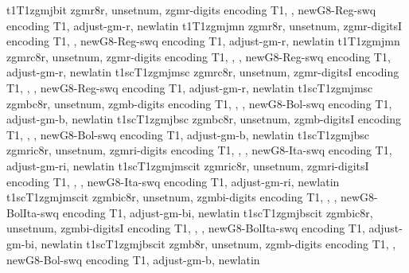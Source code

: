 {t1}{T1}{zgmj}{b}{it}{}
%
{zgmr8r,%
unsetnum,%
zgmr-digits encoding T1,%
\metrics {},%
newG8-Reg-swq encoding T1,%
adjust-gm-r,%
newlatin}
{t1}{T1}{zgmj}{m}{n}{}
%
{zgmr8r,%
unsetnum,%
zgmr-digitsI encoding T1,%
\metrics {},%
newG8-Reg-swq encoding T1,%
adjust-gm-r,%
newlatin}
{t1}{T1}{zgmj}{m}{n}{}
%
{zgmrc8r,%
unsetnum,%
zgmr-digits encoding T1,%
\metrics {}  ,%
\metrics {},%
newG8-Reg-swq encoding T1,%
adjust-gm-r,%
newlatin}
{t1sc}{T1}{zgmj}{m}{sc}{}
%
{zgmrc8r,%
unsetnum,%
zgmr-digitsI encoding T1,%
\metrics {}  ,%
\metrics {},%
newG8-Reg-swq encoding T1,%
adjust-gm-r,%
newlatin}
{t1sc}{T1}{zgmj}{m}{sc}{}
%
{zgmbc8r,%
unsetnum,%
zgmb-digits encoding T1,%
\metrics {}  ,%
\metrics {},%
newG8-Bol-swq encoding T1,%
adjust-gm-b,%
newlatin}
{t1sc}{T1}{zgmj}{b}{sc}{}
%
{zgmbc8r,%
unsetnum,%
zgmb-digitsI encoding T1,%
\metrics {}  ,%
\metrics {},%
newG8-Bol-swq encoding T1,%
adjust-gm-b,%
newlatin}
{t1sc}{T1}{zgmj}{b}{sc}{}
%
{zgmric8r,%
unsetnum,%
zgmri-digits encoding T1,%
\metrics {}  ,%
\metrics {},%
newG8-Ita-swq encoding T1,%
adjust-gm-ri,%
newlatin}
{t1sc}{T1}{zgmj}{m}{scit}{}
%
{zgmric8r,%
unsetnum,%
zgmri-digitsI encoding T1,%
\metrics {}  ,%
\metrics {},%
newG8-Ita-swq encoding T1,%
adjust-gm-ri,%
newlatin}
{t1sc}{T1}{zgmj}{m}{scit}{}
%
{zgmbic8r,%
unsetnum,%
zgmbi-digits encoding T1,%
\metrics {}  ,%
\metrics {},%
newG8-BolIta-swq encoding T1,%
adjust-gm-bi,%
newlatin}
{t1sc}{T1}{zgmj}{b}{scit}{}
%
{zgmbic8r,%
unsetnum,%
zgmbi-digitsI encoding T1,%
\metrics {}  ,%
\metrics {},%
newG8-BolIta-swq encoding T1,%
adjust-gm-bi,%
newlatin}
{t1sc}{T1}{zgmj}{b}{scit}{}
%
{zgmb8r,%
unsetnum,%
zgmb-digits encoding T1,%
\metrics {},%
newG8-Bol-swq encoding T1,%
adjust-gm-b,%
newlatin}
